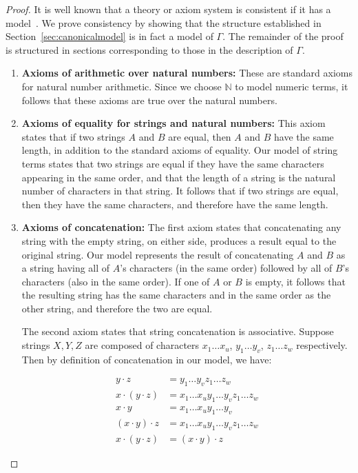 \begin{proof}
  It is well known that a theory or axiom system is consistent if it
  has a model~\cite{HodgesModelTheory}.  We prove consistency by
  showing that the structure established in
  Section~\ref{sec:canonicalmodel} is in fact a model of $\Gamma$. The
  remainder of the proof is structured in sections corresponding to
  those in the description of $\Gamma$.

  \begin{enumerate}
    

  \item \textbf{Axioms of arithmetic over natural numbers:} These are
   standard axioms for natural number arithmetic.  Since we choose
   $\mathbb{N}$ to model numeric terms, it follows that these axioms
   are true over the natural numbers.


 \item \textbf{Axioms of equality for strings and natural numbers:}
   This axiom states that if two strings $A$ and $B$ are equal, then
   $A$ and $B$ have the same length, in addition to the standard
   axioms of equality. Our model of string terms states that two
   strings are equal if they have the same characters appearing in the
   same order, and that the length of a string is the natural number
   of characters in that string.  It follows that if two strings are
   equal, then they have the same characters, and therefore have the
   same length.


 \item \textbf{Axioms of concatenation:} The first axiom states that
   concatenating any string with the empty string, on either side,
   produces a result equal to the original string.  Our model
   represents the result of concatenating $A$ and $B$ as a string
   having all of $A$'s characters (in the same order) followed by all
   of $B$'s characters (also in the same order). If one of $A$ or $B$
   is empty, it follows that the resulting string has the same
   characters and in the same order as the other string, and therefore
   the two are equal.

   The second axiom states that string concatenation is associative.
   Suppose strings $X, Y, Z$ are composed of characters $x_1 \hdots
   x_u$, $y_1 \hdots y_v$, $z_1 \hdots z_w$ respectively. Then by
   definition of concatenation in our model, we have:

  \begin{align*}
    y \cdot z & = y_1 \hdots y_v z_1 \hdots z_w \\
    x \cdot (y \cdot z) & = x_1 \hdots x_u y_1 \hdots y_v z_1 \hdots z_w \\
    x \cdot y & = x_1 \hdots x_u y_1 \hdots y_v \\
    (x \cdot y) \cdot z & = x_1 \hdots x_u y_1 \hdots y_v z_1 \hdots z_w \\
    x \cdot (y \cdot z) & = (x \cdot y) \cdot z
  \end{align*}


\end{enumerate}
\end{proof}
